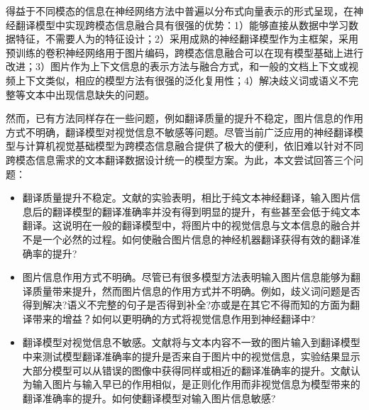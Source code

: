 得益于不同模态的信息在神经网络方法中普遍以分布式向量表示的形式呈现，在神经翻译模型中实现跨模态信息融合具有很强的优势：1）能够直接从数据中学习数据特征，不需要人为的特征设计；2）采用成熟的神经翻译模型作为主框架，采用预训练的卷积神经网络用于图片编码，跨模态信息融合可以在现有模型基础上进行改进；3）图片作为上下文信息的表示方法与融合方式，和一般的文档上下文或视频上下文类似，相应的模型方法有很强的泛化复用性；4）解决歧义词或语义不完整等文本中出现信息缺失的问题。

然而，已有方法同样存在一些问题，例如翻译质量的提升不稳定，图片信息的作用方式不明确，翻译模型对视觉信息不敏感等问题。尽管当前广泛应用的神经翻译模型与计算机视觉基础模型为跨模态信息融合提供了极大的便利，依旧难以针对不同跨模态信息需求的文本翻译数据设计统一的模型方案。为此，本文尝试回答三个问题：
\begin{itemize}
    \item {\sffamily 翻译质量提升不稳定}。文献\cite{21_dutta-chowdhury-elliott-2019-understanding,22_li-etal-2021-vision,20_wu-etal-2021-good}的实验表明，相比于纯文本神经翻译，输入图片信息后的翻译模型的翻译准确率并没有得到明显的提升，有些甚至会低于纯文本翻译。这说明在一般的翻译模型中，将图片中的视觉信息与文本信息的融合并不是一个必然的过程。如何使融合图片信息的神经机器翻译获得有效的翻译准确率的提升?
    \item {\sffamily 图片信息作用方式不明确}。尽管已有很多模型方法表明输入图片信息能够为翻译质量带来提升，然而图片信息的作用方式并不明确。例如，歧义词问题是否得到解决?语义不完整的句子是否得到补全?亦或是在其它不得而知的方面为翻译带来的增益？如何以更明确的方式将视觉信息作用到神经翻译中?
    \item {\sffamily 翻译模型对视觉信息不敏感}。文献\cite{23_elliott-2018-adversarial}将与文本内容不一致的图片输入到翻译模型中来测试模型翻译准确率的提升是否来自于图片中的视觉信息，实验结果显示大部分模型可以从错误的图像中获得同样或相近的翻译准确率的提升。文献\cite{20_wu-etal-2021-good}认为输入图片与输入早已的作用相似，是正则化作用而非视觉信息为模型带来的翻译准确率的提升。如何使翻译模型对输入图片信息敏感?
\end{itemize}

